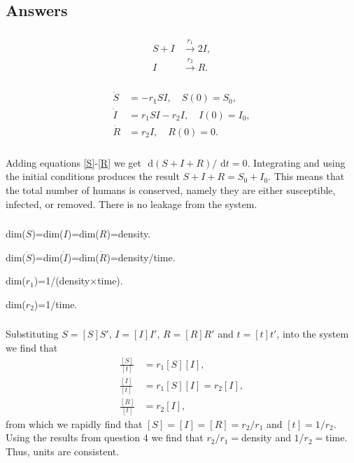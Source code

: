 \documentclass[]{article}
\newcommand{\rd}{\text{ d}}
\newcommand{\eqnto}[2]{equations \eqref{#1}-\eqref{#2}}
\renewcommand{\l}{\left(}
\renewcommand{\r}{\right)}
\begin{document}
\begin{Answ}
\subsection{Answers}
\subsubsection{}
\begin{align}
S+I&\stackrel{r_1}{\rightarrow}2I,\\
I&\stackrel{r_2}{\rightarrow}R.
\end{align}
\subsubsection{}
\begin{align}
\dot{S}&=-r_1SI,\quad S(0)=S_0,\label{S}\\
\dot{I}&=r_1SI-r_2I,\quad I(0)=I_0,\label{I}\\
\dot{R}&=r_2I,\quad R(0)=0.\label{R}
\end{align}
\subsubsection{}
Adding \eqnto{S}{R} we get $\rd \l S+I+R \r/\rd t=0$. Integrating and using the initial conditions produces the result $S+I+R=S_0+I_0$. This means that the total number of humans is conserved, namely they are either susceptible, infected, or removed. There is no leakage from the system.
\subsubsection{}
dim($S$)=dim($I$)=dim($R$)=density.

\noindent dim($\dot{S}$)=dim($\dot{I}$)=dim($\dot{R}$)=density/time.

\noindent dim($r_1$)=1/(density$\times$time).

\noindent dim($r_2$)=1/time.
\subsubsection{}
Substituting $S=[S]S'$, $I=[I]I'$, $R=[R]R'$ and $t=[t]t'$, into the system we find that 
\begin{align}
\frac{[S]}{[t]}&=r_1[S][I],\\
\frac{[I]}{[t]}&=r_1[S][I]=r_2[I],\\
\frac{[R]}{[t]}&=r_2[I],
\end{align}
from which we rapidly find that $[S]=[I]=[R]=r_2/r_1$ and $[t]=1/r_2$. Using the results from question 4 we find that $r_2/r_1=$density and $1/r_2=$time. Thus, units are consistent.

\end{Answ}
\end{document}

